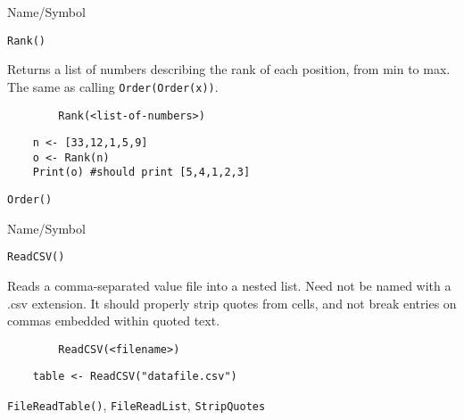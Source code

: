 \begin{desc}{Name/Symbol}
\item[Name/Symbol]	\verb+Rank()+

\item[Description]	Returns a list of numbers describing the rank of
  each position, from min to max.  The same as calling \verb+Order(Order(x))+.

\item[Usage]
\begin{verbatim}
		Rank(<list-of-numbers>)
\end{verbatim}

\item[Example]	
\begin{verbatim}
	n <- [33,12,1,5,9]
  	o <- Rank(n)
    Print(o) #should print [5,4,1,2,3]
\end{verbatim}

\item[See Also]	\verb+Order()+
\end{desc}

\rl

\begin{desc}{Name/Symbol}
\item[Name/Symbol]	\verb+ReadCSV()+

\item[Description]	Reads a comma-separated  value file into a nested
  list.  Need not be named with a .csv extension.  It should properly
  strip quotes from cells, and not break entries on commas embedded
  within quoted text.


\item[Usage]
\begin{verbatim}
		ReadCSV(<filename>)
\end{verbatim}

\item[Example]	
\begin{verbatim}
	table <- ReadCSV("datafile.csv")
\end{verbatim}

\item[See Also]	\verb+FileReadTable()+, \verb+FileReadList+, \verb+StripQuotes+
\end{desc}
\rl


